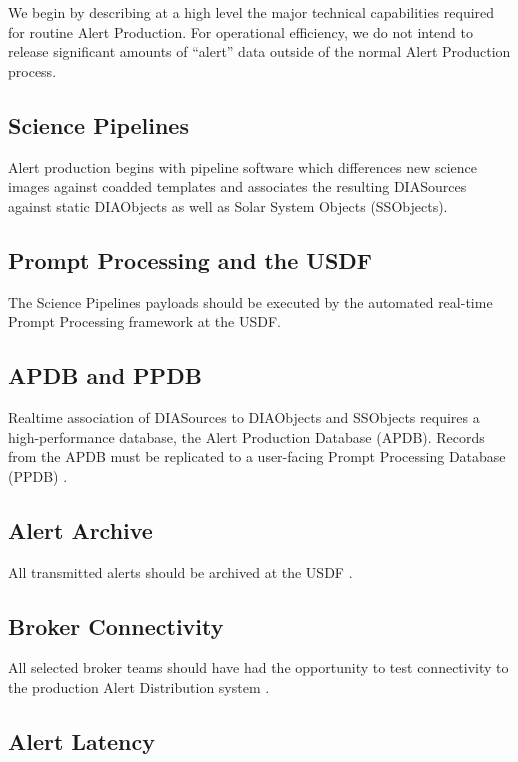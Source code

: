 \documentclass[OPS,authoryear,toc]{lsstdoc}
\begin{document}
We begin by describing at a high level the major technical capabilities required for routine Alert Production.
For operational efficiency, we do not intend to release significant amounts of ``alert'' data outside of the normal Alert Production process.

\subsection{Science Pipelines}

Alert production begins with pipeline software which differences new science images against coadded templates and associates the resulting DIASources against static DIAObjects as well as Solar System Objects (SSObjects).


\subsection{Prompt Processing and the USDF}

The Science Pipelines payloads should be executed by the automated real-time Prompt Processing framework at the USDF.

\subsection{APDB and PPDB}

Realtime association of DIASources to DIAObjects and SSObjects requires a high-performance database, the Alert Production Database (APDB).
Records from the APDB must be replicated to a user-facing Prompt Processing Database (PPDB) .

\subsection{Alert Archive}

All transmitted alerts should be archived at the USDF .

\subsection{Broker Connectivity}

All selected broker teams  should have had the opportunity to test connectivity to the production Alert Distribution system .

\subsection{Alert Latency}
\end{document}
